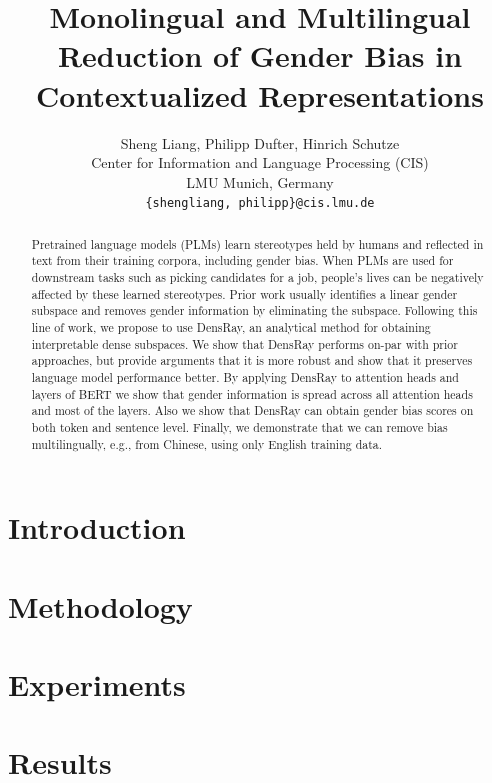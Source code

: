 \documentclass[11pt]{article}
\title{Monolingual and Multilingual Reduction of Gender Bias in Contextualized Representations}
\author{Sheng Liang, Philipp Dufter, Hinrich Schutze\\
  Center for Information and Language Processing (CIS) \\
  LMU Munich, Germany\\
  {\tt \{shengliang, philipp\}@cis.lmu.de}}
\date{}
\begin{document}
\maketitle
\begin{abstract}
	
Pretrained language models (PLMs) learn stereotypes held by
humans and reflected in text from their training corpora,
including gender bias.  When PLMs are used for downstream
tasks such as picking candidates for a job, people's lives
can be negatively affected by these learned stereotypes.
Prior work usually identifies a linear gender subspace and
removes gender information by eliminating the
subspace. Following this line of work, we propose to use DensRay, an
analytical method for obtaining interpretable dense
subspaces. We show that DensRay performs on-par with prior
approaches, but provide arguments that it is more robust and show that it preserves language model performance better. By applying DensRay to attention heads and layers of BERT 
we show that gender information is spread across all attention heads and most of the layers. Also we show that DensRay can obtain gender bias scores on both token and sentence level. Finally,
we demonstrate that we can remove bias multilingually, e.g.,
from Chinese, using only English training data.
	
\end{abstract}


\section{Introduction}


\section{Methodology}


\section{Experiments}


\section{Results}


%
\end{document}
